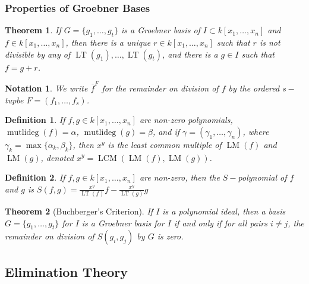 \documentclass{article}
\theoremstyle{mystyle}
\newtheorem{theorem}{Theorem}[section]
\newtheorem{definition}{Definition}[section]
\newtheorem{notation}{Notation}[section]
\DeclareMathOperator{\multideg}{mutlideg}
\DeclareMathOperator{\LT}{LT}
\DeclareMathOperator{\LM}{LM}
\DeclareMathOperator{\LCM}{LCM}
\begin{document}
\subsubsection{Properties of Groebner Bases}
\begin{theorem}
If $G=\{g_1,\hdots, g_t\}$ is a Groebner basis of $I\subset k[x_1,\hdots ,x_n]$ and $f\in k[x_1,\hdots ,x_n]$, then there is a unique $r\in k[x_1,\hdots ,x_n]$ such that $r$ is not divisible by any of $\LT(g_1),\hdots, \LT(g_t)$, and there is a $g\in I$ such that $f = g+r$. 
\end{theorem}
\begin{notation}
We write $\overline{f}^{F}$ for the remainder on division of $f$ by the ordered $s-$tupbe $F = (f_1,\hdots, f_s)$.
\end{notation}
\begin{definition}
If $f,g\in k[x_1,\hdots ,x_n]$ are non-zero polynomials, $\multideg(f) = \alpha$, $\multideg(g) = \beta$, and if $\gamma = (\gamma_1,\hdots, \gamma_n)$, where $\gamma_k = \max\{\alpha_k,\beta_k\}$, then $x^y$ is the least common multiple of $\LM(f)$ and $\LM(g)$, denoted $x^y = \LCM(\LM(f),\LM(g))$.
\end{definition}
\begin{definition}
If $f,g\in k[x_1,\hdots ,x_n]$ are non-zero, then the $S-$polynomial of $f$ and $g$ is $S(f,g) = \frac{x^y}{\LT(f)}f - \frac{x^y}{\LT(g)}g$
\end{definition}
\begin{theorem}[Buchberger's Criterion]
If $I$ is a polynomial ideal, then a basis $G=\{g_1,\hdots, g_t\}$ for $I$ is a Groebner basis for $I$ if and only if for all pairs $i\ne j$, the remainder on division of $S(g_i,g_j)$ by $G$ is zero.
\end{theorem}
\subsection{Elimination Theory}
\end{document}
